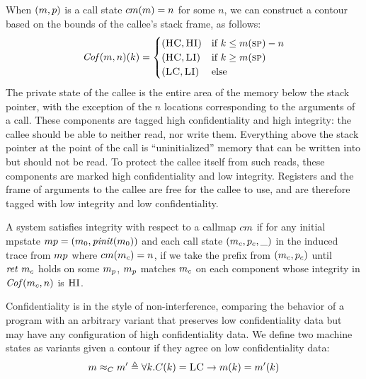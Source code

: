 \documentclass[acmsmall,review,anonymous]{acmart}\settopmatter{printfolios=true,printccs=false,printacmref=false}
\begin{document}
When \((m,p)\) is a call state \(cm(m) = n\)
for some \(n\), we can construct a contour based on the bounds of the
callee's stack frame, as follows:
\[\mathit{Cof}(m,n)(k) =
\begin{cases}
  (\textsc{HC},\textsc{HI}) & \text{if } k \leq m(\textsc{sp}) - n \\
  (\textsc{HC},\textsc{LI}) & \text{if } k \geq m(\textsc{sp}) \\
  (\textsc{LC},\textsc{LI}) & \text{else} \\
\end{cases}\]
%
The private state of the callee is the entire area of the memory below
the stack pointer, with the exception of the $n$ locations
corresponding to the arguments of a call. These components are tagged
high confidentiality and high integrity: the callee should be able to
neither read, nor write them.
%
Everything above the stack pointer at the point of the call is
``uninitialized'' memory that can be written into but should not be
read. To protect the callee itself from such reads, these components
are marked high confidentiality and low integrity.
%
Registers and the frame of arguments to the callee are free for the
callee to use, and are therefore tagged with low integrity and low
confidentiality. 



A system satisfies integrity with respect to a callmap \(cm\)
if for any initial mpstate \(mp =
(m_0,\mathit{pinit}(m_0))\) and each call state
\((m_c,p_c,\_)\) in the induced trace from \(mp\)
where \(cm(m_c) = n\), if we take the prefix from
\((m_c,p_c)\) until \(\mathit{ret}\ m_c\) holds on some
\(m_p\), \(m_p\) matches \(m_c\) on each component whose integrity
in \(\mathit{Cof}(m_c,n)\) is \(\textsc{HI}\).


Confidentiality is in the style of non-interference, comparing the behavior of
a program with an arbitrary variant that preserves low confidentiality data but
may have any configuration of high confidentiality data. We define two machine
states as variants given a contour if they agree on low confidentiality data:
  \[m \approx_C m' \triangleq \forall k .
    C(k) = \textsc{LC} \rightarrow m(k) = m'(k)\]
\end{document}
